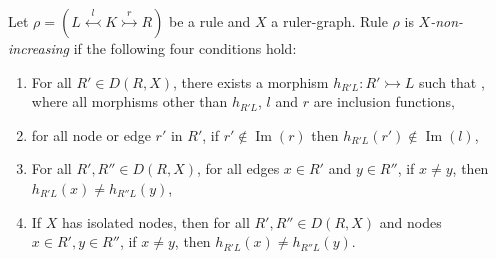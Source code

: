 \begin{definition}
    \label{def:creates_more_x_on_the_left}
    Let \(\rho = (L \overset{l}{\leftarrowtail} K \overset{r}{\rightarrowtail} R)\) be a rule and \(X\) a ruler-graph. 
    Rule \( \rho \) is \emph{\( X \)-non-increasing} if the following four conditions hold:
    \newline
    \vspace{1mm}
    \noindent
    \begin{minipage}{0.64\textwidth} 
    \begin{enumerate}
        \item For all $R' \in D(R,X)$, there exists a morphism \(h_{R'L}: R' \rightarrowtail L \) such that , where all morphisms other than $h_{R'L}$, $l$ and $r$ are inclusion functions, 
        \item \label{def:non_increasing:non_clapse}  for all node or edge $r'$ in $R'$, if $ r' \notin \operatorname{Im}(r)$ then $h_{R'L}(r') \notin \operatorname{Im}(l)$,
        \item For all $R',R'' \in D(R,X)$, for all edges $x \in R'$ and $y \in R''$, if $x \neq y$, then $h_{R'L}(x) \neq h_{R''L}(y)$,
        \item If $X$ has isolated nodes, then for all $R',R'' \in D(R,X)$ and nodes $x \in R', y \in R''$, if $x \neq y$, then $h_{R'L}(x) \neq h_{R''L}(y)$.
    \end{enumerate} 
    \end{minipage}
    \hfill
    \begin{minipage}{0.4\textwidth}
        \begin{center}

\end{center}
\end{minipage}
\end{definition}
